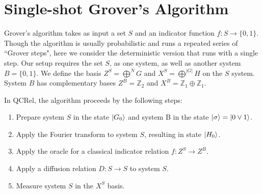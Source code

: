 \section{Single-shot Grover's Algorithm}

Grover's algorithm \cite{Grovers1996} takes as input a set $S$ and an indicator function $f:S\to\{0,1\}$. Though the algorithm is usually probabilistic and runs a repeated series of ``Grover steps", here we consider the deterministic version that runs with a single step. Our setup requires the set $S$, as one system, as well as another system $B=\{0,1\}$. We define the basis $Z^{S}=\bigoplus^NG$ and $X^S=\bigoplus^{|G|}H$ on the $S$ system.  System $B$ has complementary bases $Z^B=\mathbb{Z}_2$ and $X^B=\mathbb{Z}_1\oplus\mathbb{Z}_1$.

In QCRel, the algorithm proceeds by the following steps:
\begin{enumerate}
\item Prepare system $S$ in the state $| G_0 \rangle$ and system B in the state $| \sigma \rangle = | 0\vee 1 \rangle$.

\item Apply the Fourier transform to system $S$, resulting in state $| H_0 \rangle$.

\item Apply the oracle for a classical indicator relation $f:Z^S\to Z^B$.

\item Apply a diffusion relation $D:S\to S$ to system $S$.

\item Measure system $S$ in the $X^S$ basis.

\end{enumerate}

